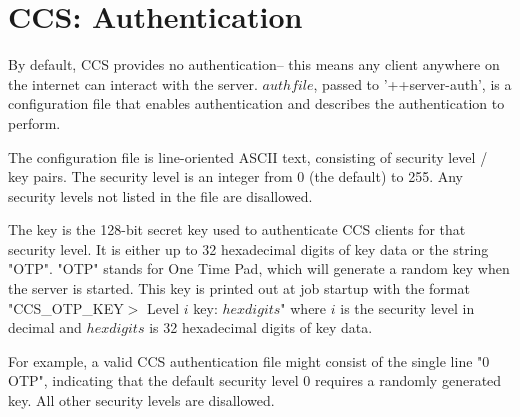 \section{CCS: Authentication}
By default, CCS provides no authentication-- this means any
client anywhere on the internet can interact with the server.
$authfile$, passed to '++server-auth', is a configuration file
that enables authentication and describes the authentication to 
perform.

The configuration file is line-oriented ASCII text,
consisting of security level / key pairs.  The security
level is an integer from 0 (the default) to 255.
Any security levels not listed in the file are disallowed.

The key is the 128-bit secret key used to authenticate CCS
clients for that security level.  It is either up 
to 32 hexadecimal digits of key data or the string "OTP".
"OTP" stands for One Time Pad, which will generate a random
key when the server is started.  This key is printed out
at job startup with the format "CCS\_OTP\_KEY$>$ Level $i$ key: $hexdigits$"
where $i$ is the security level in decimal and $hexdigits$ is
32 hexadecimal digits of key data.

For example, a valid CCS authentication file might consist of
the single line "0 OTP", indicating that the default security
level 0 requires a randomly generated key.  All other security
levels are disallowed.


